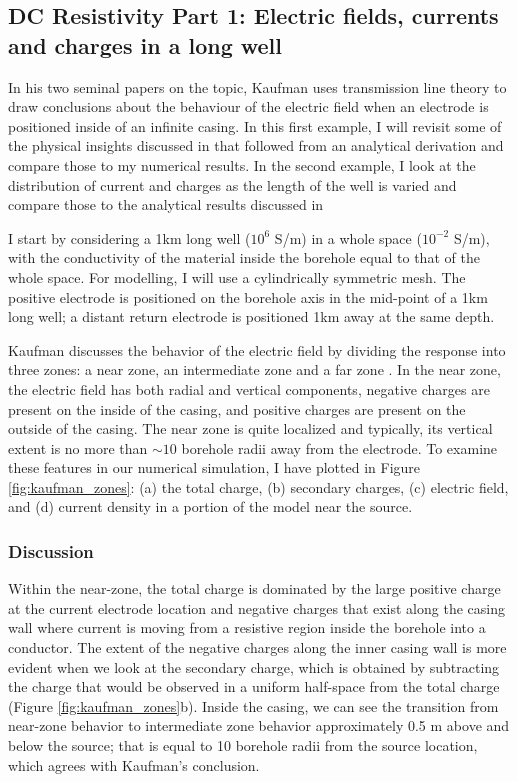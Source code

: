 \subsection{DC Resistivity Part 1: Electric fields, currents and charges in a long well}
\label{sec:dc_resistivity_part1}

In his two seminal papers on the topic, Kaufman uses transmission line theory to draw conclusions about the behaviour of the electric field when an electrode is positioned inside of an infinite casing. In this first example, I will revisit some of the physical insights discussed in \citep{Kaufman1990, Kaufman1993} that followed from an analytical derivation and compare those to my numerical results. In the second example, I look at the distribution of current and charges as the length of the well is varied and compare those to the analytical results discussed in \citep{Kaufman1993}

I start by considering a 1km long well ($10^6$ S/m) in a whole space ($10^{-2}$ S/m), with the conductivity of the material inside the borehole equal to that of the whole space.  For modelling, I will use a cylindrically symmetric mesh. The positive electrode is positioned on the borehole axis in the mid-point of a 1km long well;  a distant return electrode is positioned 1km away at the same depth.

Kaufman discusses the behavior of the electric field by dividing the response into three zones: a near zone, an intermediate zone and a far zone \citep{Kaufman1990, Kaufman1993}. In the near zone, the electric field has both radial and vertical components, negative charges are present on the inside of the casing, and positive charges are present on the outside of the casing. The near zone is quite localized and typically, its vertical extent is no more than $\sim 10$ borehole radii away from the electrode. To examine these features in our numerical simulation, I have plotted in Figure \ref{fig:kaufman_zones}: (a)  the total charge, (b) secondary charges, (c) electric field, and (d) current density in a portion of the model near the source.



\subsubsection{Discussion}

Within the near-zone, the total charge is dominated by the large positive charge at the current electrode location and negative charges that exist along the casing wall where current is moving from a resistive region inside the borehole into a conductor. The extent of the negative charges along the inner casing wall is more evident when we look at the secondary charge, which is obtained by subtracting the charge that would be observed in a uniform half-space from the total charge (Figure \ref{fig:kaufman_zones}b). Inside the casing, we can see the transition from near-zone behavior to intermediate zone behavior approximately 0.5 m above and below the source; that is equal to 10 borehole radii from the source location, which agrees with Kaufman's conclusion.

